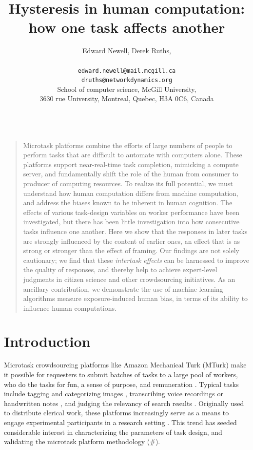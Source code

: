 \documentclass[12pt]{article}
\title{Hysteresis in human computation:\\ how one task affects another}
\author
{Edward Newell, Derek Ruths,\\
\\
\normalsize{\texttt{edward.newell@mail.mcgill.ca}}\\
\normalsize{\texttt{druths@networkdynamics.org}}\\
\normalsize{School of computer science, McGill University,}\\
\normalsize{3630 rue University, Montreal, Quebec, H3A 0C6, Canada}\\
\\
}
\date{}
\newenvironment{sciabstract}{%
\begin{quote} \bf}
{\end{quote}}
\begin{document}
 


\baselineskip24pt


\maketitle 




\begin{sciabstract}

Microtask platforms combine the efforts of large numbers 
of people to perform tasks that are difficult to automate with computers 
alone.  These platforms support near-real-time task completion, mimicking a
compute server, and fundamentally shift the role of the human from consumer to 
producer of computing resources.  To realize its full
potential, we must understand how human computation differs from machine 
computation, and address the biases known to be inherent in 
human cognition.  The effects of various task-design variables on worker
performance have been investigated, but there has been little 
investigation into how consecutive tasks influence one another. Here we show 
that the responses in later tasks are strongly influenced by the content of 
earlier ones, an effect that is as strong or stronger than the effect of 
framing.  Our findings are not solely cautionary; we find
that these \textit{intertask effects} can be harnessed to improve the quality 
of responses, and thereby help to achieve expert-level judgments in citizen 
science and other crowdsourcing initiatives. 
As an ancillary contribution, we demonstrate the use of machine learning 
algorithms measure exposure-induced human bias, in terms of its ability to 
influence human computations. 
\end{sciabstract}

\section*{Introduction}
Microtask crowdsourcing platforms like Amazon Mechanical Turk (MTurk) make it 
possible for requesters to submit batches of tasks to a large pool of 
workers, who do the tasks for fun, a sense of purpose, and remuneration 
\cite{kazai2013analysis,Antin20122925}.  
Typical tasks include tagging and categorizing images 
\cite{6116320,Zhai2012357}, transcribing voice recordings 
\cite{chandler2013breaking,paolacci2010running}
or handwritten notes \cite{Berinsky2012351,Finnerty2013}, and judging the 
relevancy of search results 
\cite{le2010ensuring,grady2010crowdsourcing,alonso2009can,kazai2013analysis}.
Originally used to distribute clerical work, these platforms 
increasingly serve as a means to engage experimental participants in a 
research 
setting \cite{paolacci2010running,Berinsky2012351,snow2008cheap,alonso2009can}.
This trend has seeded considerable interest in characterizing the parameters
of task design, and validating the microtask platform methodology (\#).
\end{document}
